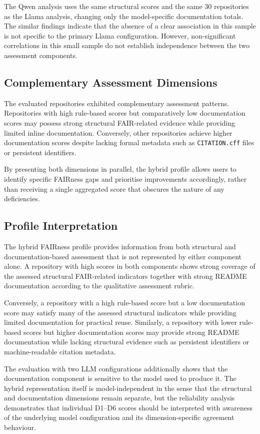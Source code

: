 The Qwen analysis uses the same structural scores and the same
30 repositories as the Llama analysis, changing only the model-specific
documentation totals. The similar findings indicate that the absence
of a clear association in this sample is not specific to the primary
Llama configuration. However, non-significant correlations in this
small sample do not establish independence between the two assessment
components.

\subsection{Complementary Assessment Dimensions}

The evaluated repositories exhibited complementary assessment 
patterns. Repositories with high rule-based scores but comparatively low
documentation scores may possess strong structural FAIR-related
evidence while providing limited inline documentation. Conversely, 
other repositories achieve higher documentation scores despite 
lacking formal metadata such as \texttt{CITATION.cff} files or 
persistent identifiers.

By presenting both dimensions in parallel, the hybrid profile 
allows users to identify specific FAIRness gaps and prioritise 
improvements accordingly, rather than receiving a single aggregated 
score that obscures the nature of any deficiencies.

\subsection{Profile Interpretation}

The hybrid FAIRness profile provides information from both structural
and documentation-based assessment that is not represented by either
component alone. A repository with high scores in both components
shows strong coverage of the assessed structural FAIR-related
indicators together with strong README documentation according to the
qualitative assessment rubric.

Conversely, a repository with a high rule-based score but a low
documentation score may satisfy many of the assessed structural
indicators while providing limited documentation for practical reuse.
Similarly, a repository with lower rule-based scores but higher
documentation scores may provide strong README documentation while
lacking structural evidence such as persistent identifiers or
machine-readable citation metadata.

The evaluation with two LLM configurations additionally shows that
the documentation component is sensitive to the model used to produce
it. The hybrid representation itself is model-independent in the
sense that the structural and documentation dimensions remain
separate, but the reliability analysis demonstrates that individual
D1--D6 scores should be interpreted with awareness of the underlying
model configuration and its dimension-specific agreement behaviour.

